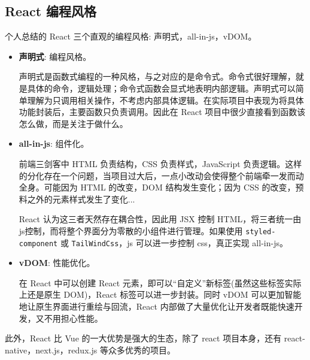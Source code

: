 \subsection{React 编程风格}

个人总结的 React 三个直观的编程风格: 声明式，all-in-js，vDOM。
\begin{itemize}
    \item \textbf{声明式}: 编程风格。
    
    声明式是函数式编程的一种风格，与之对应的是命令式。命令式很好理解，就是具体的命令，逻辑处理；命令式函数会显式地表明内部逻辑。声明式可以简单理解为只调用相关操作，不考虑内部具体逻辑。在实际项目中表现为将具体功能封装后，主要函数只负责调用。因此在 React 项目中很少直接看到函数该怎么做，而是关注于做什么。
    \item \textbf{all-in-js}: 组件化。
    
    前端三剑客中 HTML 负责结构，CSS 负责样式，JavaScript 负责逻辑。这样的分化存在一个问题，当项目过大后，一点小改动会使得整个前端牵一发而动全身。可能因为 HTML 的改变，DOM 结构发生变化；因为 CSS 的改变，预料之外的元素样式发生了变化...
    
    React 认为这三者天然存在耦合性，因此用 JSX 控制 HTML，将三者统一由js控制，而将整个界面分为零散的小组件进行管理。如果使用 \texttt{styled-component} 或 \texttt{TailWindCss}，js 可以进一步控制 css，真正实现 all-in-js。

    \item \textbf{vDOM}: 性能优化。
    
    在 React 中可以创建 React 元素，即可以“自定义”新标签(虽然这些标签实际上还是原生 DOM)，React 标签可以进一步封装。同时 vDOM 可以更加智能地让原生界面进行重绘与回流，React 内部做了大量优化让开发者既能快速开发，又不用担心性能。
\end{itemize}

此外，React 比 Vue 的一大优势是强大的生态，除了 react 项目本身，还有 react-native，next.js，redux.js 等众多优秀的项目。

\newpage